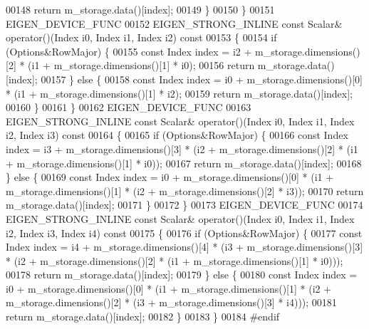 \begin{DoxyCode}
00148         \textcolor{keywordflow}{return} m\_storage.data()[index];
00149       \}
00150     \}
00151     EIGEN\_DEVICE\_FUNC
00152     EIGEN\_STRONG\_INLINE \textcolor{keyword}{const} Scalar& operator()(Index i0, Index i1, Index i2)\textcolor{keyword}{ const}
00153 \textcolor{keyword}{    }\{
00154       \textcolor{keywordflow}{if} (Options&RowMajor) \{
00155          \textcolor{keyword}{const} Index index = i2 + m\_storage.dimensions()[2] * (i1 + m\_storage.dimensions()[1] * i0);
00156          \textcolor{keywordflow}{return} m\_storage.data()[index];
00157       \} \textcolor{keywordflow}{else} \{
00158          \textcolor{keyword}{const} Index index = i0 + m\_storage.dimensions()[0] * (i1 + m\_storage.dimensions()[1] * i2);
00159         \textcolor{keywordflow}{return} m\_storage.data()[index];
00160       \}
00161     \}
00162     EIGEN\_DEVICE\_FUNC
00163     EIGEN\_STRONG\_INLINE \textcolor{keyword}{const} Scalar& operator()(Index i0, Index i1, Index i2, Index i3)\textcolor{keyword}{ const}
00164 \textcolor{keyword}{    }\{
00165       \textcolor{keywordflow}{if} (Options&RowMajor) \{
00166         \textcolor{keyword}{const} Index index = i3 + m\_storage.dimensions()[3] * (i2 + m\_storage.dimensions()[2] * (i1 + 
      m\_storage.dimensions()[1] * i0));
00167         \textcolor{keywordflow}{return} m\_storage.data()[index];
00168       \} \textcolor{keywordflow}{else} \{
00169         \textcolor{keyword}{const} Index index = i0 + m\_storage.dimensions()[0] * (i1 + m\_storage.dimensions()[1] * (i2 + 
      m\_storage.dimensions()[2] * i3));
00170         \textcolor{keywordflow}{return} m\_storage.data()[index];
00171       \}
00172     \}
00173     EIGEN\_DEVICE\_FUNC
00174     EIGEN\_STRONG\_INLINE \textcolor{keyword}{const} Scalar& operator()(Index i0, Index i1, Index i2, Index i3, Index i4)\textcolor{keyword}{ const}
00175 \textcolor{keyword}{    }\{
00176       \textcolor{keywordflow}{if} (Options&RowMajor) \{
00177         \textcolor{keyword}{const} Index index = i4 + m\_storage.dimensions()[4] * (i3 + m\_storage.dimensions()[3] * (i2 + 
      m\_storage.dimensions()[2] * (i1 + m\_storage.dimensions()[1] * i0)));
00178         \textcolor{keywordflow}{return} m\_storage.data()[index];
00179       \} \textcolor{keywordflow}{else} \{
00180         \textcolor{keyword}{const} Index index = i0 + m\_storage.dimensions()[0] * (i1 + m\_storage.dimensions()[1] * (i2 + 
      m\_storage.dimensions()[2] * (i3 + m\_storage.dimensions()[3] * i4)));
00181         \textcolor{keywordflow}{return} m\_storage.data()[index];
00182       \}
00183     \}
00184 \textcolor{preprocessor}{#endif}

\end{DoxyCode}
